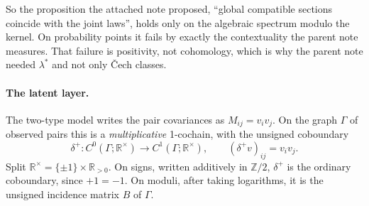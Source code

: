 \documentclass[11pt]{article}
\theoremstyle{definition}\newtheorem{definition}{Definition}\newtheorem{remark}{Remark}
\begin{document}
So the proposition the attached note proposed, ``global compatible sections coincide with the joint laws'', holds only on the algebraic
spectrum modulo the kernel. On probability points it fails by exactly the contextuality the parent note measures. That failure is
positivity, not cohomology, which is why the parent note needed $\lambda^*$ and not only Čech classes.

\paragraph{The latent layer.} The two-type model writes the pair covariances as $M_{ij}=v_iv_j$. On the graph $\Gamma$ of observed
pairs this is a \emph{multiplicative} 1-cochain, with the unsigned coboundary
\[
\delta^+:C^0(\Gamma;\mathbb R^\times)\to C^1(\Gamma;\mathbb R^\times),\qquad (\delta^+v)_{ij}=v_iv_j .
\]
Split $\mathbb R^\times=\{\pm1\}\times\mathbb R_{>0}$. On signs, written additively in $\mathbb Z/2$, $\delta^+$ is the ordinary
coboundary, since $+1=-1$. On moduli, after taking logarithms, it is the unsigned incidence matrix $B$ of $\Gamma$.
\end{document}

